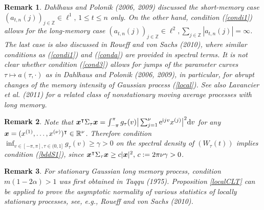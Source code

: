 \documentclass[10pt]{article}
\def\N{\mathbb{N}}
\def\R{\mathbb{R}}
\def\Z{\mathbb{Z}}
\def\i{\mathrm i}
\def\d{\mathrm d}
\def\e{\mathrm e}
\newcommand{\mbf}[1]{\mbox{\boldmath $#1$}}
\newtheorem{rem}{Remark}
\begin{document}
\begin{rem} {\rm
Dahlhaus and Polonik (2006, 2009) discussed  the short-memory case $(a_{t,n}(j))_{j\in \Z}\in \ell^1, \, 1\leq t \leq n$  only. On the
other hand,
condition (\ref{condi1}) allows for the long-memory case $(a_{t,n}(j))_{j\in \Z}\in \ell^2, \sum_{j\in \Z} |a_{t,n}(j)| = \infty$.
The last case is also discussed in Roueff and von Sachs (2010), where similar conditions as (\ref{condi1}) and (\ref{conda}) are provided in
spectral terms. It is not clear whether condition (\ref{cond3}) allows for jumps of the parameter curves $\tau \mapsto a (\tau, \cdot)$
as in Dahlhaus and Polonik (2006, 2009), in particular, for abrupt changes of the memory intensity of Gaussian process (\ref{local}). See also
Lavancier {\it et al.} (2011) for a related class of nonstationary moving average processes with long memory.
}
\end{rem}


\begin{rem} {\rm Note that
${\mbf x}^\intercal \Sigma_\tau {\mbf x} = \int_{-\pi }^\pi g_\tau(v) \big| \sum_{j=1}^\nu \e^{\i j v} x^{(j)} \big|^2 \d v $
for any ${\mbf x} = (x^{(1)}, \dots, x^{(\nu)})^\intercal \in \R^\nu$. Therefore condition
$\inf_{v \in [-\pi, \pi], \tau \in (0,1]} g_\tau (v) \ge \gamma > 0$ on the spectral density of $(W_{\tau}(t))$
implies condition (\ref{bddS1}), since
${\mbf x}^\intercal \Sigma_\tau {\mbf x}
\ge c|{\mbf x}|^2, \, c := 2\pi \nu \gamma >0 $.


}
\end{rem}

\begin{rem} {\rm For stationary Gaussian long memory process,  condition  $m(1-2\alpha)>1$ was first obtained in Taqqu (1975).
Proposition \ref{localCLT} can be applied to prove the asymptotic normality of various
statistics of  locally stationary processes, see, e.g., Roueff and von Sachs (2010).



}
\end{rem}
\end{document}
